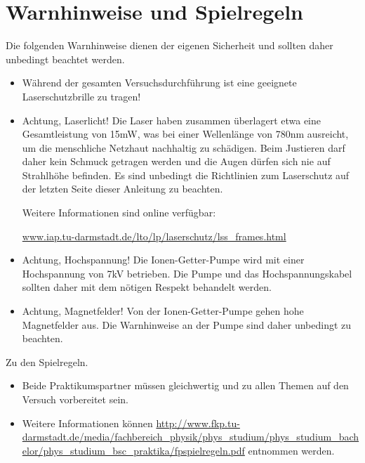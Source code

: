 \documentclass[
class=book,
accentcolor=1b,
custommargins=geometry,
fontsize=11pt,
thesis={type=Versuchsanleitung},
ruledheaders=all,
headline=false,
instbox=false,
marginpar=false,
title=small,
ignore-missing-data=true,
twoside=false,
pdfa=false %
]{apqpub}
\begin{document}
	\tableofcontents
	
	\mainmatter
	\setcounter{page}{1}
	
	
	
	
\section{Warnhinweise und Spielregeln}

Die folgenden Warnhinweise dienen der eigenen Sicherheit und sollten daher unbedingt beachtet werden.

\begin{itemize}
	\item Während der gesamten Versuchsdurchführung ist eine geeignete Laserschutzbrille zu tragen!
	
	\item Achtung, Laserlicht! Die Laser haben zusammen überlagert etwa eine Gesamtleistung von 15mW, was bei
	einer Wellenlänge von 780nm ausreicht, um die menschliche Netzhaut nachhaltig zu schädigen. Beim Justieren
	darf daher kein Schmuck getragen werden und die Augen dürfen sich nie auf Strahlhöhe befinden.
	Es sind unbedingt die Richtlinien zum Laserschutz auf der letzten Seite dieser Anleitung zu beachten.
	
	Weitere Informationen sind online verfügbar:
	
	\url{www.iap.tu-darmstadt.de/lto/lp/laserschutz/lss_frames.html}
	
	\item Achtung, Hochspannung! Die Ionen-Getter-Pumpe wird mit einer Hochspannung von 7kV betrieben. Die
	Pumpe und das Hochspannungskabel sollten daher mit dem nötigen Respekt behandelt werden.
	
	\item Achtung, Magnetfelder! Von der Ionen-Getter-Pumpe gehen hohe Magnetfelder aus. Die Warnhinweise an
	der Pumpe sind daher unbedingt zu beachten.
\end{itemize}

Zu den Spielregeln.

\begin{itemize}
	\item Beide Praktikumspartner müssen gleichwertig und zu allen Themen auf den Versuch vorbereitet sein.
	
	\item Weitere Informationen können \url{http://www.fkp.tu-darmstadt.de/media/fachbereich_physik/phys_studium/phys_studium_bachelor/phys_studium_bsc_praktika/fpspielregeln.pdf} entnommen werden.
\end{itemize}
\end{document}
